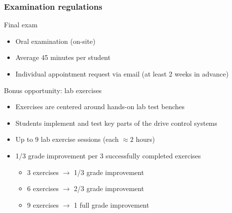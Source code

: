 \begin{frame}
    \frametitle{Examination regulations}
    \begin{block}{Final exam}
        \begin{itemize}
            \item Oral examination (on-site)
            \item Average 45 minutes per student
            \item Individual appointment request via email (at least 2 weeks in advance)
        \end{itemize}
    \end{block}
    \pause
    \begin{block}{Bonus opportunity: lab exercises}
        \begin{itemize}
            \item Exercises are centered around hands-on lab test benches
            \item Students implement and test key parts of the drive control systems
            \item Up to 9 lab exercise sessions (each $\approx 2$ hours)
            \item 1/3 grade improvement per 3 successfully completed exercises
                  \begin{itemize}
                      \item 3 exercises $\rightarrow$ 1/3 grade improvement
                      \item 6 exercises $\rightarrow$ 2/3 grade improvement
                      \item 9 exercises $\rightarrow$ 1 full grade improvement
                  \end{itemize}
        \end{itemize}
    \end{block}
\end{frame}


